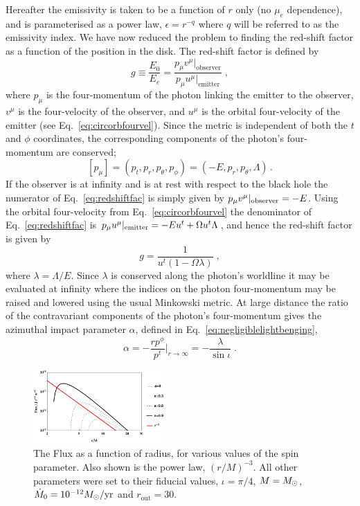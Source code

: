 Hereafter the emissivity is taken to be a function of $r$ only (no $\mu_{e}$ dependence), and is parameterised as a power law, $\epsilon=r^{-q}$ where $q$ will be referred to as the emissivity index. We have now reduced the problem to finding the red-shift factor as a function of the position in the disk. The red-shift factor is defined by
\begin{equation} g \equiv \frac{E_{0}}{E_{e}} = \frac{p_{\mu}v^{\mu}\big|_{\textrm{observer}}}{p_{\mu}u^{\mu}\big|_{\textrm{emitter}}} \; ,\end{equation}
where $p_{\mu}$ is the four-momentum of the photon linking the emitter to the observer, $v^{\mu}$ is the four-velocity of the observer, and $u^{\mu}$ is the orbital four-velocity of the emitter (see Eq.\ \ref{eq:circorbfourvel}). Since the metric is independent of both the $t$ and $\phi$ coordinates, the corresponding components of the photon's four-momentum are conserved;
\begin{equation} \left[ p_{\mu} \right] = (p_{t},p_{r},p_{\theta},p_{\phi}) = (-E,p_{r},p_{\theta},\Lambda) \, .\end{equation}
If the observer is at infinity and is at rest with respect to the black hole the numerator of Eq.\ \ref{eq:redshiftfac} is simply given by ${p_{\mu}v^{\mu}\small|_{\textrm{observer}}=-E}$. Using the orbital four-velocity from Eq.\ \ref{eq:circorbfourvel} the denominator of Eq.\ \ref{eq:redshiftfac} is ${p_{\mu}u^{\mu}\small|_{\textrm{emitter}}=-Eu^{t}+\Omega u^{t} \Lambda}$, and hence the red-shift factor is given by
\begin{equation}\label{eq:redshiftfac} g=  \frac{1}{u^{t}(1-\Omega \lambda)} \; ,\end{equation}
where $\lambda = \Lambda /E$. Since $\lambda$ is conserved along the photon's worldline it may be evaluated at infinity where the indices on the photon four-momentum may be raised and lowered using the usual Minkowski metric. At large distance the ratio of the contravariant components of the photon's four-momentum gives the azimuthal impact parameter $\alpha$, defined in Eq.\ \ref{eq:negligiblelightbenging},
\begin{equation} \alpha = -\frac{r p^{\phi}}{p^{t}} \Big|_{r\rightarrow \infty} =-\frac{\lambda}{\sin\iota}\; .\end{equation}

\begin{figure}[h]
 \centering
 \includegraphics[trim=0cm 0cm 0cm 0cm, width=0.45\textwidth]{KerrFlux.pdf}
 \caption{The Flux as a function of radius, for various values of the spin parameter. Also shown is the power law, $(r/M)^{-3}$. All other parameters were set to their fiducial values, $\iota=\pi/4$, $M=M_{ \odot }$, $\dot{M}_{0}=10^{-12}M_{ \odot }/\textrm{yr}$ and $r_{\textrm{out}}=30$.}
 \label{fig:KerrFlux}
\end{figure}

